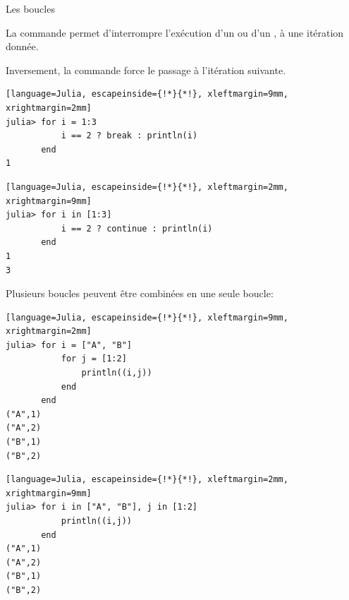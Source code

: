 \begin{frame}[containsverbatim]{Les boucles}
\par{La commande  permet d'interrompre l'exécution d'un  ou d'un , à une itération donnée.}
\vspace{2ex}
\par{Inversement, la commande  force le passage à l'itération suivante.}
\vspace{-2ex}
\begin{multicols}{2}
\begin{lstlisting}[language=Julia, escapeinside={!*}{*!}, xleftmargin=9mm, xrightmargin=2mm]
julia> for i = 1:3
           i == 2 ? break : println(i)
       end
1
\end{lstlisting}
\begin{lstlisting}[language=Julia, escapeinside={!*}{*!}, xleftmargin=2mm, xrightmargin=9mm]
julia> for i in [1:3]
           i == 2 ? continue : println(i)
       end
1
3
\end{lstlisting}
\end{multicols}\vspace{-2ex}
\par{Plusieurs boucles  peuvent être combinées en une seule boucle:}
\vspace{-2ex}
\begin{multicols}{2}
\begin{lstlisting}[language=Julia, escapeinside={!*}{*!}, xleftmargin=9mm, xrightmargin=2mm]
julia> for i = ["A", "B"]
           for j = [1:2]
               println((i,j))
           end
       end
("A",1)
("A",2)
("B",1)
("B",2)
\end{lstlisting}
\begin{lstlisting}[language=Julia, escapeinside={!*}{*!}, xleftmargin=2mm, xrightmargin=9mm]
julia> for i in ["A", "B"], j in [1:2]
           println((i,j))
       end
("A",1)
("A",2)
("B",1)
("B",2)
\end{lstlisting}
\end{multicols}\vspace{-2ex}
\end{frame}


